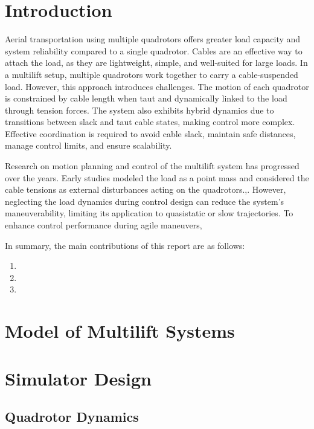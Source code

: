 \documentclass[12pt,twoside,letterpaper]{article}
\begin{document}
\section{Introduction}
Aerial transportation using multiple quadrotors offers greater load capacity and system reliability compared to a single quadrotor. Cables are an effective way to attach the load, as they are lightweight, simple, and well-suited for large loads. In a multilift setup, multiple quadrotors work together to carry a cable-suspended load. However, this approach introduces challenges. The motion of each quadrotor is constrained by cable length when taut and dynamically linked to the load through tension forces. The system also exhibits hybrid dynamics due to transitions between slack and taut cable states, making control more complex. Effective coordination is required to avoid cable slack, maintain safe distances, manage control limits, and ensure scalability.

Research on motion planning and control of the multilift system has progressed over the years. Early studies modeled the load as a point mass and considered the cable tensions as external disturbances acting on the quadrotors.\cite{Geo_point},\cite{2018point}. However, neglecting the load dynamics during control design can reduce the system's maneuverability, limiting its application to quasistatic or slow trajectories. To enhance control performance during agile maneuvers,

In summary, the main contributions of this report are as follows:
\begin{enumerate}
    \item 
    \item 
    \item 
\end{enumerate}


\newpage


\section{Model of Multilift Systems}

\newpage


\section{Simulator Design}
\subsection{Quadrotor Dynamics}
\end{document}
